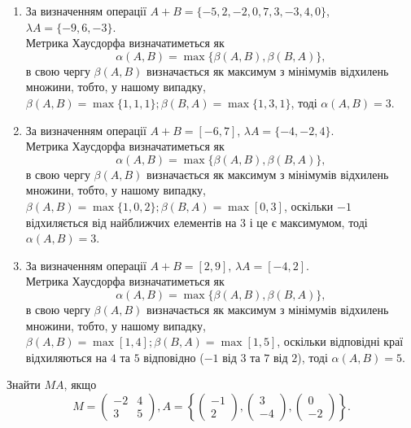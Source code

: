 \begin{solution}

	\begin{enumerate}
	    \item За визначенням операції $A + B = \{-5, 2, -2, 0, 7, 3, -3, 4, 0\}$, $\lambda A = \{-9, 6, -3 \}$. \\
	    
	    Метрика Хаусдорфа визначатиметься як \[\alpha (A, B) = \max\{\beta (A, B), \beta (B, A)\},\] в свою чергу $\beta (A, B)$ визначається як максимум з мінімумів відхилень множини, тобто, у нашому випадку, $\beta (A, B) = \max\{1, 1, 1\}; \beta (B, A) = \max\{1, 3, 1\}$, тоді $\alpha (A, B) = 3$.
	    
	    \item За визначенням операції $A + B = [-6,7]$, $\lambda A = \{-4, -2, 4 \}$.\\
	    
	    Метрика Хаусдорфа визначатиметься як \[\alpha (A, B) = \max\{\beta (A, B), \beta (B, A)\},\] в свою чергу $\beta (A, B)$ визначається як максимум з мінімумів відхилень множини, тобто, у нашому випадку, $\beta (A, B) = \max\{1, 0, 2\}; \beta (B, A) = \max[0, 3]$, оскільки $-1$ відхиляється від найближчих елементів на $3$ і це є максимумом, тоді $\alpha (A, B) = 3$.
	    
	    \item За визначенням операції $A + B = [2,9]$, $\lambda A = [-4,2]$. \\
	    
	    Метрика Хаусдорфа визначатиметься як \[\alpha (A, B) = \max\{\beta (A, B), \beta (B, A)\},\] в свою чергу $\beta (A, B)$ визначається як максимум з мінімумів відхилень множини, тобто, у нашому випадку, $\beta (A, B) = \max[1,4]; \beta (B, A) = \max[1, 5]$, оскільки відповідні краї відхиляються на $4$ та $5$ відповідно ($-1$ від $3$ та $7$ від $2$), тоді $\alpha (A, B) = 5$.
	    
	\end{enumerate}
	
\end{solution}

\begin{problem}
	Знайти $MA$, якщо
	\[
	M=
  \begin{pmatrix}
    -2 & 4 \\
    3 & 5
  \end{pmatrix}
  , A= 
  \left\{
  \begin{pmatrix}
    -1 \\
    2 
  \end{pmatrix},
    \begin{pmatrix}
    3 \\
    -4 
  \end{pmatrix},
    \begin{pmatrix}
    0 \\
    -2 
  \end{pmatrix}
  \right\}
  .\]
\end{problem}

